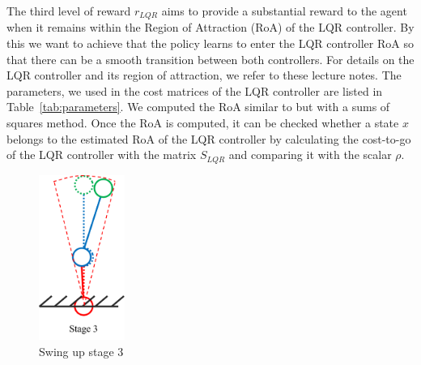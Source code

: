 The third level of reward $r_{LQR}$ aims to provide a substantial reward to the
agent when it remains within the Region of Attraction (RoA) of the LQR
controller. By this we want to achieve that the policy learns to enter the LQR
controller RoA so that there can be a smooth transition between both
controllers. For details on the LQR controller and its region of attraction, we
refer to these lecture notes. The parameters, we used in
the cost matrices of the LQR controller are listed in
Table~\ref{tab:parameters}. We computed the RoA similar to
but with a sums of squares method.  Once the RoA is computed,
it can be checked whether a state $x$ belongs to the estimated RoA of the LQR
controller by calculating the cost-to-go of the LQR controller with the matrix
$S_{LQR}$ and comparing it with the scalar $\rho$.

\begin{figure}[H]
    \centering
    \includegraphics[width=0.25\textwidth]{figures/methodology/stage3.png} %
    \caption{Swing up stage 3}
    \label{fig:my_image_label} %
\end{figure}

\cleardoublepage
